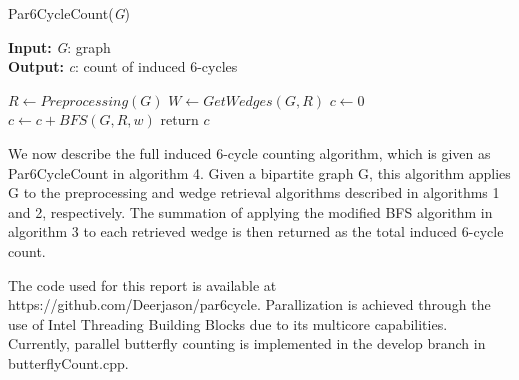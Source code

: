 \documentclass[11pt]{article}
\begin{document}
\begin{algorithm}[H]
\caption{Par6CycleCount(\textit{G})}
\hspace*{\algorithmicindent} \textbf{Input:} \textit{G}: graph \\
\hspace*{\algorithmicindent} \textbf{Output:} \textit{c}: count of induced 6-cycles
\begin{algorithmic}[1]
    \State $R \gets Preprocessing(G)$
    \State $W \gets GetWedges(G, R)$
    \State $c \gets $0
        \State $c \gets c + BFS(G, R, w)$
    \EndFor
    \State return $c$
\end{algorithmic}
\end{algorithm}

We now describe the full induced 6-cycle counting algorithm, which is given as Par6CycleCount in algorithm 4.
Given a bipartite graph G, this algorithm applies G to the preprocessing and wedge retrieval algorithms described in algorithms 1 and 2, respectively.
The summation of applying the modified BFS algorithm in algorithm 3 to each retrieved wedge is then returned as the total induced 6-cycle count.

The code used for this report is available at https://github.com/Deerjason/par6cycle.
Parallization is achieved through the use of Intel Threading Building Blocks due to its multicore capabilities.
Currently, parallel butterfly counting is implemented in the develop branch in butterflyCount.cpp.

{}

\end{document}
